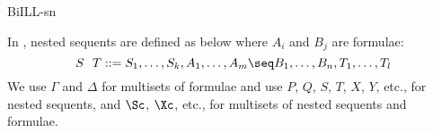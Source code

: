 \begin{entry}{BiILL-sn}
\begin{calculus}
\end{calculus}


\begin{clarifications}
In \cite{Clouston13CSL}, nested sequents are defined as below
where $A_i$ and $B_j$ are formulae:
$$
S~~T ::= S_1,\dots,S_k,A_1,\dots,A_m \seq B_1,\dots, B_n, T_1, \dots,T_l
$$
We use $\Gamma$ and $\Delta$ for multisets of formulae and use
$P$, $Q$, $S$, $T$, $X$, $Y$, etc., for nested
sequents, and $\Sc$, $\Xc$, etc., for
multisets of nested sequents and formulae.
\end{clarifications}

\begin{history}
\end{history}

\begin{technicalities}
\end{technicalities}



%
%
%
%
%
%
% 
%




\end{entry}
